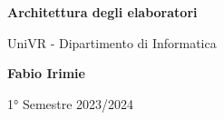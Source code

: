 \begin{titlepage}
	\begin{center}
		\vspace*{1cm}

		\Huge
		\textbf{Architettura degli elaboratori}

		\vspace{0.5cm}
		\LARGE
		UniVR - Dipartimento di Informatica

		\vspace{1.5cm}

		\textbf{Fabio Irimie}

		\vfill


		\vspace{0.8cm}


		1° Semestre 2023/2024

	\end{center}
\end{titlepage}

